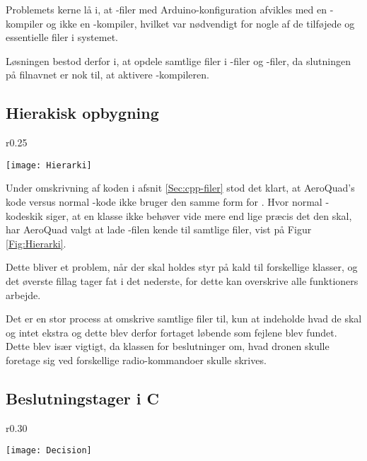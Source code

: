 \documentclass[Main]{subfiles}
\begin{document}
Problemets kerne lå i, at -filer med Arduino-konfiguration afvikles med en -kompiler og ikke en -kompiler, hvilket var nødvendigt for nogle af de tilføjede og essentielle filer i systemet.

Løsningen bestod derfor i, at opdele samtlige filer i -filer og -filer, da slutningen på filnavnet er nok til, at aktivere -kompileren.



\subsection{Hierakisk opbygning}

\begin{wrapfigure}{r}{0.25\textwidth}
  \vspace{-20pt}
  \begin{center}
	\texttt{[image: Hierarki]}
  \end{center}
  \vspace{-20pt}
  \caption{AeroQuad's opbygning.}
  \label{Fig:Hierarki}
  \vspace{-20pt}
\end{wrapfigure}

Under omskrivning af koden i afsnit \ref{Sec:cpp-filer} stod det klart, at Aero\-Quad's kode versus normal -kode ikke bruger den samme form for .
Hvor normal -kodeskik siger, at en klasse ikke behøver vide mere end lige præcis det den skal, har AeroQuad valgt at lade -filen kende til samtlige filer, vist på Figur \ref{Fig:Hierarki}.

Dette bliver et problem, når der skal holdes styr på kald til forskellige klasser, og det øverste fillag tager fat i det nederste, for dette kan overskrive alle funktioners arbejde.

Det er en stor process at omskrive samtlige filer til, kun at indeholde hvad de skal og intet ekstra og dette blev derfor fortaget løbende som fejlene blev fundet.
Dette blev især vigtigt, da klassen for beslutninger om, hvad dronen skulle foretage sig ved forskellige radio-kommandoer skulle skrives.


\subsection{Beslutningstager i C}
\begin{wrapfigure}{r}{0.30\textwidth}
  \vspace{-20pt}
  \begin{center}
	\texttt{[image: Decision]}
  \end{center}
  \vspace{-20pt}
  \caption{Beslutningstagning.}
  \label{Fig:Decision}
  \vspace{-10pt}
\end{wrapfigure}
\end{document}
